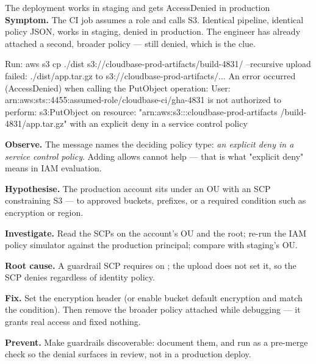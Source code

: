 \begin{debuglab}{The deployment works in staging and gets AccessDenied in production}
\textbf{Symptom.} The CI job assumes a role and calls S3. Identical pipeline, identical policy JSON, works in staging, denied in production. The engineer has already attached a second, broader policy --- still denied, which is the clue.

\begin{outbox}
Run: aws s3 cp ./dist s3://cloudbase-prod-artifacts/build-4831/ --recursive
upload failed: ./dist/app.tar.gz to s3://cloudbase-prod-artifacts/...
An error occurred (AccessDenied) when calling the PutObject operation:
User: arn:aws:sts::4455:assumed-role/cloudbase-ci/gha-4831 is not authorized
to perform: s3:PutObject on resource: "arn:aws:s3:::cloudbase-prod-artifacts
/build-4831/app.tar.gz" with an explicit deny in a service control policy
\end{outbox}

\begin{tickcheck}
  \item \textbf{Observe.} The message names the deciding policy type: \emph{an explicit deny in a service control policy}. Adding allows cannot help --- that is what "explicit deny" means in IAM evaluation.
  \item \textbf{Hypothesise.} The production account sits under an OU with an SCP constraining S3 --- to approved buckets, prefixes, or a required condition such as encryption or region.
  \item \textbf{Investigate.} Read the SCPs on the account's OU and the root; re-run the IAM policy simulator against the production principal; compare with staging's OU.
  \item \textbf{Root cause.} A guardrail SCP requires  on ; the upload does not set it, so the SCP denies regardless of identity policy.
  \item \textbf{Fix.} Set the encryption header (or enable bucket default encryption and match the condition). Then remove the broader policy attached while debugging --- it grants real access and fixed nothing.
  \item \textbf{Prevent.} Make guardrails discoverable: document them, and run  as a pre-merge check so the denial surfaces in review, not in a production deploy.
\end{tickcheck}
\end{debuglab}

